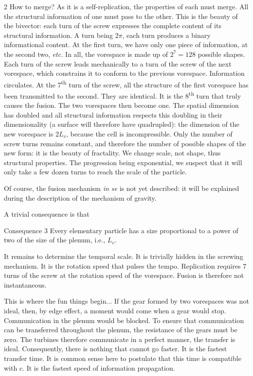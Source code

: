 \begin{multicols}{2}
	How to merge? As it is a self-replication, the 
	properties of each must merge. All the structural 
	information of one must pass to the other. This is the beauty of the 
	bivector: each turn of the screw expresses the complete content of 
	its structural information. A turn being $2\pi$, each turn 
	produces a binary informational content. At the first turn, we have 
	only one piece of information, at the second two, \textit{etc.} In all, the vorespace is 
	made up of $2^7=128$ possible shapes. Each turn of the screw leads 
	mechanically to a turn of the screw of the next vorespace, 
	which constrains it to conform to the previous vorespace. 
	Information circulates. At the 7\textsuperscript{th} turn of the screw, all the structure of the first vorespace 
	has been transmitted to the second. They are identical. It is the 8\textsuperscript{th} turn that 
	truly causes the fusion. The two vorespaces then become 
	one. The spatial dimension has doubled and all structural 
	information respects this doubling in their dimensionality (a 
	surface will therefore have quadrupled): the dimension of the new vorespace is 
	$2L_v$, because the cell is incompressible. Only the number 
	of screw turns remains constant, and therefore the number of possible shapes of 
	the new form: it is the beauty of fractality. We change scale, not 
	shape, thus structural properties. The progression being 
	exponential, we suspect that it will only take a few dozen 
	turns to reach the scale of the particle.
	
	Of course, the fusion mechanism \textit{in se} is not yet described: 
	it will be explained during the description of the mechanism of gravity.
	
	A trivial consequence is that
	
	\begin{mybox}[breakable,colback=blue!10, colbacktitle=pkcolor]{Consequence 3}
		Every elementary particle has a size proportional to a power of two of the size of the 
		plenum, i.e., $L_v$.
	\end{mybox}
	\medskip
	
	It remains to determine the temporal scale. It is trivially hidden 
	in the screwing mechanism. It is the rotation speed that pulses 
	the tempo. Replication requires 7 turns of the screw at the 
	rotation speed of the vorespace. Fusion is therefore not instantaneous.
	
	This is where the fun things begin$\dots$ If the gear formed 
	by two vorespaces was not ideal, then, by edge effect, a 
	moment would come when a gear would stop. 
	Communication in the plenum would be blocked. To ensure that 
	communication can be transferred throughout the plenum, the 
	resistance of the gears must be zero. The turbines therefore 
	communicate in a perfect manner, the transfer is ideal. 
	Consequently, there is nothing that cannot 
	go faster. It is the fastest transfer time. It is 
	common sense here to postulate that this time is compatible with c. 
	It is the fastest speed of information propagation.
	

\end{multicols}
